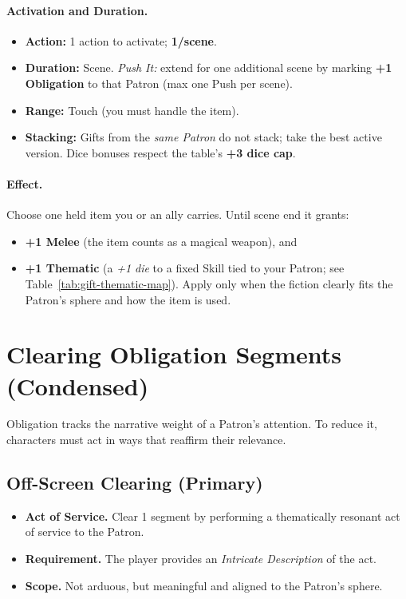 \paragraph{Activation and Duration.}
\begin{itemize}
  \item \textbf{Action:} 1 action to activate; \textbf{1/scene}.
  \item \textbf{Duration:} Scene. \emph{Push It:} extend for one additional scene by marking \textbf{+1 Obligation} to that Patron (max one Push per scene).
  \item \textbf{Range:} Touch (you must handle the item).
  \item \textbf{Stacking:} Gifts from the \emph{same Patron} do not stack; take the best active version. Dice bonuses respect the table's \textbf{+3 dice cap}.
\end{itemize}

\paragraph{Effect.}
Choose one held item you or an ally carries. Until scene end it grants:
\begin{itemize}
  \item \textbf{+1 Melee} (the item counts as a magical weapon), and
  \item \textbf{+1 Thematic} (a \emph{+1 die} to a fixed Skill tied to your Patron; see Table~\ref{tab:gift-thematic-map}). Apply only when the fiction clearly fits the Patron's sphere and how the item is used.
\end{itemize}


\section{Clearing Obligation Segments (Condensed)}\label{sec:obligation-clearing-srd}

Obligation tracks the narrative weight of a Patron’s attention. To reduce it, characters must act in ways that reaffirm their relevance.

\subsection*{Off-Screen Clearing (Primary)}
\begin{itemize}
\item \textbf{Act of Service.} Clear 1 segment by performing a thematically resonant act of service to the Patron.
\item \textbf{Requirement.} The player provides an \emph{Intricate Description} of the act.
\item \textbf{Scope.} Not arduous, but meaningful and aligned to the Patron’s sphere.
\end{itemize}


